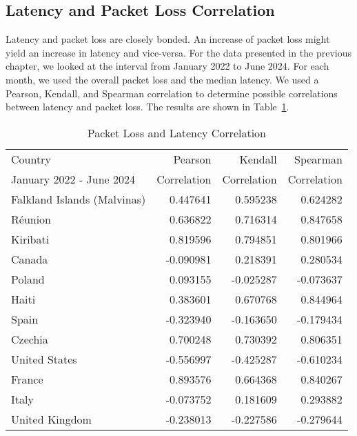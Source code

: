 \subsection{Latency and Packet Loss Correlation} \label{sec:latency-packetloss-correlation}

Latency and packet loss are closely bonded. An increase of packet loss might
yield an increase in latency and vice-versa. For the data presented in the
previous chapter, we looked at the interval from January 2022 to June 2024. For
each month, we used the overall packet loss and the median latency. We used a
Pearson, Kendall, and Spearman correlation to determine possible correlations
between latency and packet loss. The results are shown in
Table~\ref{fig:packetloss-latency-correlation}.

\begin{table}[ht]
	\footnotesize
	\caption{Packet Loss and Latency Correlation}
	\label{fig:packetloss-latency-correlation}
	\begin{tabular}{lrrr}
		\toprule
		Country                     & Pearson     & Kendall     & Spearman    \\
		January 2022 - June 2024    & Correlation & Correlation & Correlation \\
		\midrule
		Falkland Islands (Malvinas) & 0.447641    & 0.595238    & 0.624282    \\
		Réunion                     & 0.636822    & 0.716314    & 0.847658    \\
		Kiribati                    & 0.819596    & 0.794851    & 0.801966    \\
		Canada                      & -0.090981   & 0.218391    & 0.280534    \\
		Poland                      & 0.093155    & -0.025287   & -0.073637   \\
		Haiti                       & 0.383601    & 0.670768    & 0.844964    \\
		Spain                       & -0.323940   & -0.163650   & -0.179434   \\
		Czechia                     & 0.700248    & 0.730392    & 0.806351    \\
		United States               & -0.556997   & -0.425287   & -0.610234   \\
		France                      & 0.893576    & 0.664368    & 0.840267    \\
		Italy                       & -0.073752   & 0.181609    & 0.293882    \\
		United Kingdom              & -0.238013   & -0.227586   & -0.279644   \\

\end{tabular}
\end{table}
